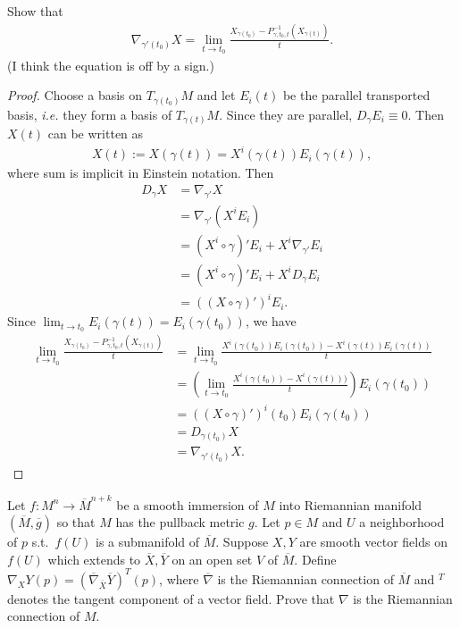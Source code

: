 \documentclass[12pt]{article}
\begin{document}
\begin{problem}[LN14 0.18]
Show that
\begin{align*}
	\nabla _{ \gamma'(t_0)} X = \lim_{ t \to t_0} \frac{X_{ \gamma(t_0)} - P_{ \gamma, t_0,t}^{-1} (X_{ \gamma(t)})}{ t}.
\end{align*}
(I think the equation is off by a sign.)
\end{problem}
\begin{proof}
Choose a basis on $ T_{ \gamma(t_0)} M$ and let $ E_i(t)$ be the parallel transported basis, \emph{i.e.} they form a basis of $ T_{ \gamma(t)}M$. Since they are parallel, $ D_{ \gamma} E_i \equiv 0$. Then $ X(t)$ can be written as
 \begin{align*}
	 X(t) := X ( \gamma(t)) = X^{i}( \gamma(t)) E_i( \gamma(t)),
\end{align*}
where sum is implicit in Einstein notation. Then
\begin{align*}
	D_{ \gamma} X &= \nabla _{ \gamma'} X \\
	&= \nabla _{ \gamma'} \left( X^{i} E_i \right)  \\
	&= (X^{i} \circ \gamma)' E_i + X^{i} \nabla_{ \gamma'} E_i \\
	&= (X^{i} \circ \gamma)' E_i + X^{i} D_{ \gamma} E_i \\
	&= ((X \circ \gamma)')^{i} E_i .
\end{align*}
Since $ \lim_{ t \to t_0} E_i( \gamma(t)) = E_i( \gamma(t_0)) $, we have
\begin{align*}
	\lim_{ t \to t_0} \frac{X_{ \gamma(t_0)} - P_{ \gamma, t_0,t}^{-1} (X_{ \gamma(t)})}{ t} &= \lim_{ t \to t_0} \frac{X^{i}( \gamma(t_0)) E_i( \gamma(t_0)) - X^{i}( \gamma(t)) E_i( \gamma(t))}{t }  \\
	&= \left( \lim_{ t \to t_0} \frac{X^{i}( \gamma(t_0)) - X^{i}( \gamma(t) ) )}{t}  \right)  E_i( \gamma(t_0)) \\
	&= ((X \circ \gamma)')^{i}(t_0) E_i( \gamma(t_0))  \\
	&= D_{ \gamma(t_0)} X \\
	&= \nabla_{ \gamma'(t_0)} X .
\end{align*}
\end{proof}
\begin{problem}[Do Carmo 3.3]
Let $ f: M^{n} \to \overline{M}^{n+k}$ be a smooth immersion of $ M$ into Riemannian manifold  $ (\overline{M}, \overline{g})$ so that $ M$ has the pullback metric  $ g$. Let  $ p \in M$ and $ U$ a neighborhood of  $ p$ s.t.\ $ f(U)$ is a submanifold of  $ \overline{M}$. Suppose $ X,Y$ are smooth vector fields on  $ f(U)$ which extends to  $ \overline{X},\overline{Y}$ on an open set $ V$ of $ \overline{M}$. Define $ \nabla _X Y (p) = \left( \overline{ \nabla }_{ \overline{X}} \overline{Y} \right)^{T} (p) $, where $ \overline{\nabla }$ is the Riemannian connection of $ \overline{M}$ and $ ^{T}$ denotes the tangent component of a vector field. Prove that $ \nabla $ is the Riemannian connection of $ M$.
\end{problem}
\end{document}
